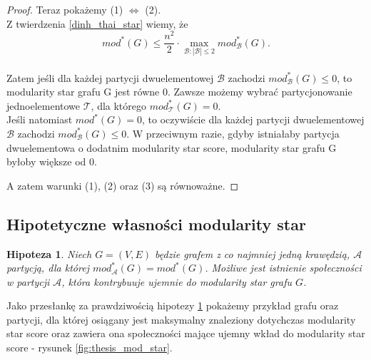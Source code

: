 \documentclass[letterpaper,12pt]{article}
\newtheorem{hypothesis}{Hipoteza}
\begin{document}
\begin{proof}
  Teraz pokażemy (1) \(\Leftrightarrow\) (2).\\

  \noindent Z twierdzenia \ref{dinh_thai_star} wiemy, że
  \[mod^*(G) \leq \frac{n^2}{2} \cdot \max_{\mathcal{B}:|\mathcal{B}|\leq 2}mod_{\mathcal{B}}^*(G).\]\\

  Zatem jeśli dla każdej partycji dwuelementowej \(\mathcal{B}\) zachodzi \(mod_{\mathcal{B}}^*(G) \leq 0\),
  to modularity star grafu G jest równe 0. Zawsze możemy wybrać partycjonowanie jednoelementowe \(\mathcal{T}\), dla którego \(mod_{\mathcal{T}}^*(G)=0\).\\
  Jeśli natomiast \(mod^*(G)=0\), to oczywiście dla każdej partycji dwuelementowej \(\mathcal{B}\) zachodzi \(mod_{\mathcal{B}}^*(G) \leq 0\). W przeciwnym razie, gdyby istniałaby partycja dwuelementowa o dodatnim modularity star score, modularity star grafu G byłoby większe od 0.



  A zatem warunki (1), (2) oraz (3) są równoważne.
\end{proof}

\subsection{Hipotetyczne własności modularity star}
\begin{hypothesis}
  \label{thesis_minus_mod}
  Niech \(G = (V,E)\) będzie grafem z co najmniej jedną krawędzią, \(\mathcal{A}\) partycją, dla której \(mod_{\mathcal{A}}^*(G) = mod^*(G)\). Możliwe jest istnienie społeczności w partycji \(\mathcal{A}\), która kontrybuuje ujemnie do modularity star grafu \(G\).
\end{hypothesis}

Jako przesłankę za prawdziwością hipotezy \ref{thesis_minus_mod} pokażemy przykład grafu oraz partycji, dla której osiągany jest maksymalny znaleziony dotychczas modularity star score oraz zawiera ona społeczności mające ujemny wkład do modularity star score - rysunek \ref{fig:thesis_mod_star}.
\end{document}
